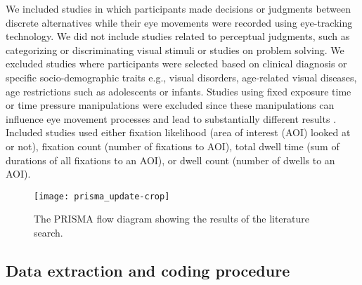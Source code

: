 We included studies in which participants made decisions or judgments between discrete alternatives while their eye movements were recorded using eye-tracking technology. We did not include studies related to perceptual judgments, such as categorizing or discriminating visual stimuli or studies on problem solving. We excluded studies where participants were selected based on clinical diagnosis or specific socio-demographic traits e.g., visual disorders, age-related visual diseases, age restrictions such as adolescents or infants. Studies using fixed exposure time or time pressure manipulations were excluded since these manipulations can influence eye movement processes \citep{orquin2018a} and lead to substantially different results \citep{simola2019a}. Included studies used either fixation likelihood (area of interest (AOI) looked at or not), fixation count (number of fixations to AOI), total dwell time (sum of durations of all fixations to an AOI), or dwell count (number of dwells to an AOI). 


\begin{figure}[H]
\texttt{[image: prisma\_update-crop]}
\centering
\caption{The PRISMA flow diagram showing the results of the literature search.}
\label{fig:flow_diagram}
\end{figure}


\subsection{Data extraction and coding procedure}

